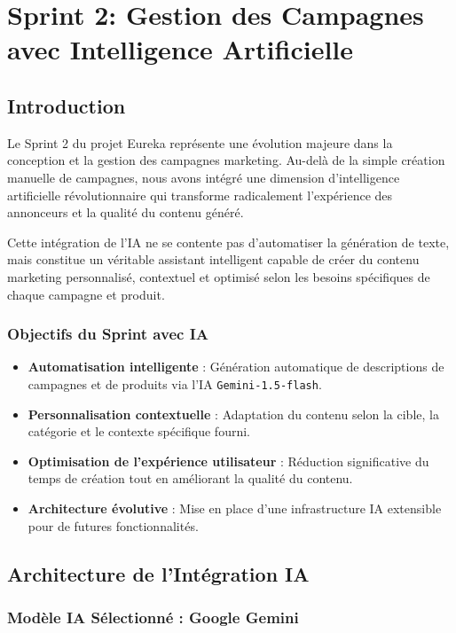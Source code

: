 \chapter{Sprint 2: Gestion des Campagnes avec Intelligence Artificielle}

\section{Introduction}

Le Sprint 2 du projet Eureka représente une évolution majeure dans la conception et la gestion des campagnes marketing. Au-delà de la simple création manuelle de campagnes, nous avons intégré une dimension d'intelligence artificielle révolutionnaire qui transforme radicalement l'expérience des annonceurs et la qualité du contenu généré.

Cette intégration de l'IA ne se contente pas d'automatiser la génération de texte, mais constitue un véritable assistant intelligent capable de créer du contenu marketing personnalisé, contextuel et optimisé selon les besoins spécifiques de chaque campagne et produit.

\subsection{Objectifs du Sprint avec IA}

\begin{itemize}[label=\textbullet]
    \item \textbf{Automatisation intelligente} : Génération automatique de descriptions de campagnes et de produits via l'IA \texttt{Gemini-1.5-flash}.
    \item \textbf{Personnalisation contextuelle} : Adaptation du contenu selon la cible, la catégorie et le contexte spécifique fourni.
    \item \textbf{Optimisation de l'expérience utilisateur} : Réduction significative du temps de création tout en améliorant la qualité du contenu.
    \item \textbf{Architecture évolutive} : Mise en place d'une infrastructure IA extensible pour de futures fonctionnalités.
\end{itemize}

\section{Architecture de l'Intégration IA}

\subsection{Modèle IA Sélectionné : Google Gemini}

